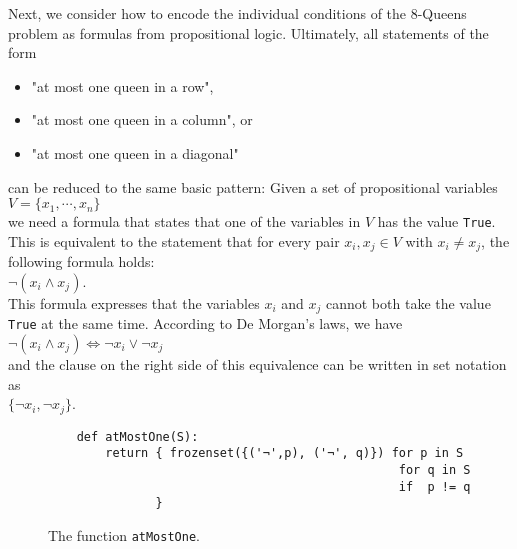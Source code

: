 Next, we consider how to encode the individual conditions of the 8-Queens problem as formulas from
propositional logic. Ultimately, all statements of the form 
\begin{itemize}
\item "at most one queen in a row",
\item "at most one queen in a column", or
\item "at most one queen in a diagonal"
\end{itemize}
can be reduced to the same basic pattern:
Given a set of propositional variables \\[0.2cm]
\hspace*{1.3cm} $V = \{ x_1, \cdots, x_n \}$ \\[0.2cm]
we need a formula that states that  one of the variables in
$V$ has the value \texttt{True}. This is equivalent to the statement that for every pair
$x_i, x_j \in V$ with $x_i \neq x_j$, the following formula holds: \\[0.2cm]
\hspace*{1.3cm} $\neg (x_i \wedge x_j)$. \\[0.2cm]
This formula expresses that the variables $x_i$ and $x_j$ cannot both take the value
\texttt{True} at the same time. According to De Morgan's laws, we have
\\[0.2cm]
\hspace*{1.3cm}
$\neg (x_i \wedge x_j) \Leftrightarrow \neg x_i \vee \neg x_j$
\\[0.2cm]
and the clause on the right side of this equivalence can be written in set notation as
\\[0.2cm]
\hspace*{1.3cm}  $\{\neg x_i, \neg x_j \}$. 

\begin{figure}[!ht]
  \centering
\begin{verbatim}
    def atMostOne(S): 
        return { frozenset({('¬',p), ('¬', q)}) for p in S
                                                 for q in S 
                                                 if  p != q 
               }
\end{verbatim}
\vspace*{-0.3cm}
  \caption{The function \texttt{atMostOne}.}
  \label{fig:atMostOne}
\end{figure}

